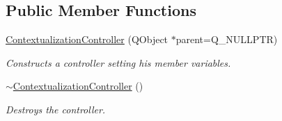 \subsection*{Public Member Functions}
\begin{DoxyCompactItemize}
\item 
\mbox{\hyperlink{classContextualizationController_a055cc7f78056ccc0d0a55023402a29ee}{Contextualization\+Controller}} (Q\+Object $\ast$parent=Q\+\_\+\+N\+U\+L\+L\+P\+TR)
\begin{DoxyCompactList}\small\item\em Constructs a controller setting his member variables. \end{DoxyCompactList}\item 
\mbox{\label{classContextualizationController_ae5b1fa3bf3a7b92c8454e8cd98558989}} 
\mbox{\hyperlink{classContextualizationController_ae5b1fa3bf3a7b92c8454e8cd98558989}{$\sim$\+Contextualization\+Controller}} ()
\begin{DoxyCompactList}\small\item\em Destroys the controller. \end{DoxyCompactList}\end{DoxyCompactItemize}
